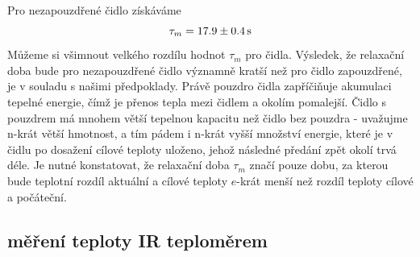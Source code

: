 \documentclass[czech,11pt,a4paper]{article}
\begin{document}
	Pro nezapouzdřené čidlo získáváme 
	\begin{equation}
			\tau_m = 17.9 \pm 0.4 \,\rm s
	\end{equation}
	Můžeme si všimnout velkého rozdílu hodnot $\tau _m$ pro čidla. Výsledek, že relaxační doba bude pro nezapouzdřené čidlo významně kratší než pro čidlo zapouzdřené, je v souladu s našimi předpoklady. Právě pouzdro čidla zapříčiňuje akumulaci tepelné energie, čímž je přenos tepla mezi čidlem a okolím pomalejší. Čidlo s pouzdrem má mnohem větší tepelnou kapacitu než čidlo bez pouzdra - uvažujme n-krát větší hmotnost, a tím pádem i n-krát vyšší množství energie, které je v čidlu po dosažení cílové teploty uloženo, jehož následné předání zpět okolí trvá déle. Je nutné konstatovat, že relaxační doba $\tau_m$ značí pouze dobu, za kterou bude teplotní rozdíl aktuální a cílové teploty $e$-krát menší než rozdíl teploty cílové a počáteční.
	\subsection{měření teploty IR teploměrem}
\end{document}
